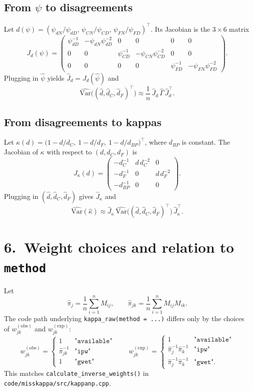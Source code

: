 \documentclass[11pt]{article}
\begin{document}
\subsection*{From $\psi$ to disagreements}

Let $d(\psi)=(\psi_{dN}/\psi_{dD},\,\psi_{CN}/\psi_{CD},\,\psi_{FN}/\psi_{FD})^\top$.
Its Jacobian is the $3\times 6$ matrix
\[
  J_d(\psi)=
  \begin{pmatrix}
    \psi_{dD}^{-1} & -\psi_{dN}\psi_{dD}^{-2} & 0 & 0 & 0 & 0 \\
    0 & 0 & \psi_{CD}^{-1} & -\psi_{CN}\psi_{CD}^{-2} & 0 & 0 \\
    0 & 0 & 0 & 0 & \psi_{FD}^{-1} & -\psi_{FN}\psi_{FD}^{-2}
  \end{pmatrix}.
\]
Plugging in $\hat\psi$ yields $\widehat{J}_d=J_d(\hat\psi)$ and
\[
  \widehat{\mathrm{Var}}\big((\hat d,\hat d_C,\hat d_F)^\top\big)
  \approx \frac{1}{n}\,\widehat{J}_d\,\widehat{\Gamma}\,\widehat{J}_d^\top.
\]

\subsection*{From disagreements to kappas}

Let $\kappa(d)=\big(1-d/d_C,\ 1-d/d_F,\ 1-d/d_{BP}\big)^\top$, where $d_{BP}$ is
constant. The Jacobian of $\kappa$ with respect to $(d,d_C,d_F)$ is
\[
  J_\kappa(d)=
  \begin{pmatrix}
    -d_C^{-1} & d\,d_C^{-2} & 0 \\
    -d_F^{-1} & 0 & d\,d_F^{-2} \\
    -d_{BP}^{-1} & 0 & 0
  \end{pmatrix}.
\]
Plugging in $(\hat d,\hat d_C,\hat d_F)$ gives $\widehat{J}_\kappa$ and
\[
  \widehat{\mathrm{Var}}(\hat\kappa)
  \approx
  \widehat{J}_\kappa\,
  \widehat{\mathrm{Var}}\big((\hat d,\hat d_C,\hat d_F)^\top\big)\,
  \widehat{J}_\kappa^\top.
\]

\section*{6.\ Weight choices and relation to \texttt{method}}

Let
\[
  \hat\pi_j=\frac1n\sum_{i=1}^n M_{ij},
  \qquad
  \hat\pi_{jk}=\frac1n\sum_{i=1}^n M_{ij}M_{ik}.
\]
The code path underlying \texttt{kappa\_raw(method = ...)} differs only by the
choices of $w^{(\mathrm{obs})}_{jk}$ and $w^{(\mathrm{exp})}_{jk}$:
\[
  w^{(\mathrm{obs})}_{jk} =
  \begin{cases}
    1 & \texttt{"available"} \\
    \hat\pi_{jk}^{-1} & \texttt{"ipw"} \\
    1 & \texttt{"gwet"}
  \end{cases}
  \qquad
  w^{(\mathrm{exp})}_{jk} =
  \begin{cases}
    1 & \texttt{"available"} \\
    \hat\pi_j^{-1}\hat\pi_k^{-1} & \texttt{"ipw"} \\
    \hat\pi_j^{-1}\hat\pi_k^{-1} & \texttt{"gwet"}.
  \end{cases}
\]
This matches \texttt{calculate\_inverse\_weights()} in
\texttt{code/misskappa/src/kappanp.cpp}.
\end{document}
